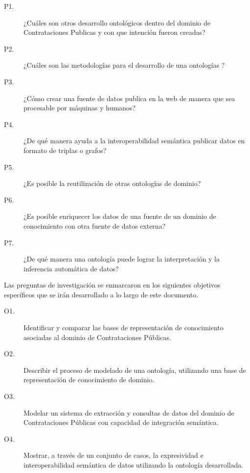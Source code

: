 \begin{description}
    \item[P1.] ¿Cuáles son otros desarrollo ontológicos dentro del dominio de Contrataciones Publicas y con que intención fueron creadas? 
    \item[P2.] ¿Cuáles son las metodologías para el desarrollo de una ontologías ?
    \item[P3.] ¿Cómo crear una fuente de datos publica en la web de manera que sea procesable por máquinas y humanos?
    \item[P4.] ¿De qué manera ayuda a la interoperabilidad semántica publicar datos en formato de triplas o grafos?
    \item[P5.] ¿Es posible la reutilización de otras ontologías de dominio?
    \item[P6.] ¿Es posible enriquecer los datos  de una fuente de un dominio de conocimiento con otra fuente de datos externa?
    \item[P7.] ¿De qué manera una ontología puede lograr la interpretación y la inferencia automática de datos?
    
\end{description} 

Las preguntas de investigación se enmarcaron en los siguientes objetivos específicos que se irán desarrollado a lo largo de este documento.

\begin{description}
    \item[O1.] Identificar y comparar las bases de representación de conocimiento asociadas al dominio de Contrataciones Públicas.
    \item[O2.] Describir el proceso de modelado de una ontología, utilizando una base de representación de conocimiento de dominio.
    \item[O3.] Modelar un sistema de extracción y consultas de datos del dominio de Contrataciones Públicas con capacidad de integración semántica.
    \item[O4.] Mostrar, a través de un conjunto de casos, la expresividad e interoperabilidad semántica de datos utilizando la ontología desarrollada.
\end{description} 


